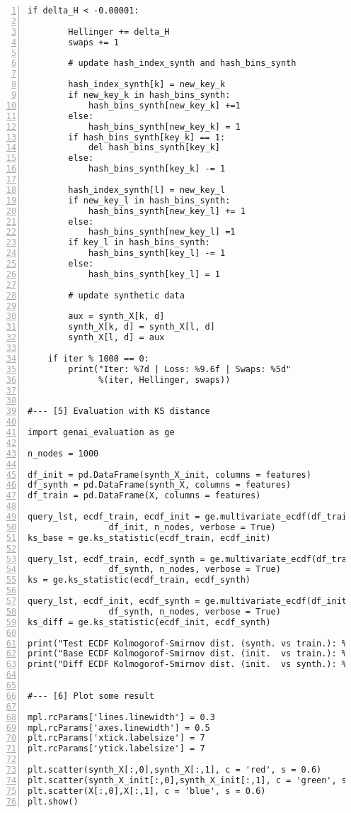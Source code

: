 \documentclass[oneside,10pt]{book}
\begin{document}
\begin{lstlisting}[numbers=left]
    if delta_H < -0.00001:

        Hellinger += delta_H
        swaps += 1

        # update hash_index_synth and hash_bins_synth

        hash_index_synth[k] = new_key_k
        if new_key_k in hash_bins_synth:
            hash_bins_synth[new_key_k] +=1
        else:
            hash_bins_synth[new_key_k] = 1
        if hash_bins_synth[key_k] == 1:
            del hash_bins_synth[key_k]
        else: 
            hash_bins_synth[key_k] -= 1
   
        hash_index_synth[l] = new_key_l
        if new_key_l in hash_bins_synth:
            hash_bins_synth[new_key_l] += 1
        else:
            hash_bins_synth[new_key_l] =1
        if key_l in hash_bins_synth:
            hash_bins_synth[key_l] -= 1
        else:
            hash_bins_synth[key_l] = 1

        # update synthetic data

        aux = synth_X[k, d]
        synth_X[k, d] = synth_X[l, d]
        synth_X[l, d] = aux

    if iter % 1000 == 0:
        print("Iter: %7d | Loss: %9.6f | Swaps: %5d" 
              %(iter, Hellinger, swaps)) 


#--- [5] Evaluation with KS distance

import genai_evaluation as ge

n_nodes = 1000

df_init = pd.DataFrame(synth_X_init, columns = features)
df_synth = pd.DataFrame(synth_X, columns = features)
df_train = pd.DataFrame(X, columns = features) 

query_lst, ecdf_train, ecdf_init = ge.multivariate_ecdf(df_train, 
                df_init, n_nodes, verbose = True) 
ks_base = ge.ks_statistic(ecdf_train, ecdf_init)

query_lst, ecdf_train, ecdf_synth = ge.multivariate_ecdf(df_train, 
                df_synth, n_nodes, verbose = True) 
ks = ge.ks_statistic(ecdf_train, ecdf_synth)

query_lst, ecdf_init, ecdf_synth = ge.multivariate_ecdf(df_init, 
                df_synth, n_nodes, verbose = True) 
ks_diff = ge.ks_statistic(ecdf_init, ecdf_synth)

print("Test ECDF Kolmogorof-Smirnov dist. (synth. vs train.): %6.4f" %(ks))
print("Base ECDF Kolmogorof-Smirnov dist. (init.  vs train.): %6.4f" %(ks_base))
print("Diff ECDF Kolmogorof-Smirnov dist. (init.  vs synth.): %6.4f" %(ks_diff))


#--- [6] Plot some result

mpl.rcParams['lines.linewidth'] = 0.3
mpl.rcParams['axes.linewidth'] = 0.5
plt.rcParams['xtick.labelsize'] = 7
plt.rcParams['ytick.labelsize'] = 7

plt.scatter(synth_X[:,0],synth_X[:,1], c = 'red', s = 0.6)
plt.scatter(synth_X_init[:,0],synth_X_init[:,1], c = 'green', s = 0.6)
plt.scatter(X[:,0],X[:,1], c = 'blue', s = 0.6)
plt.show()
\end{lstlisting}
\end{document}

